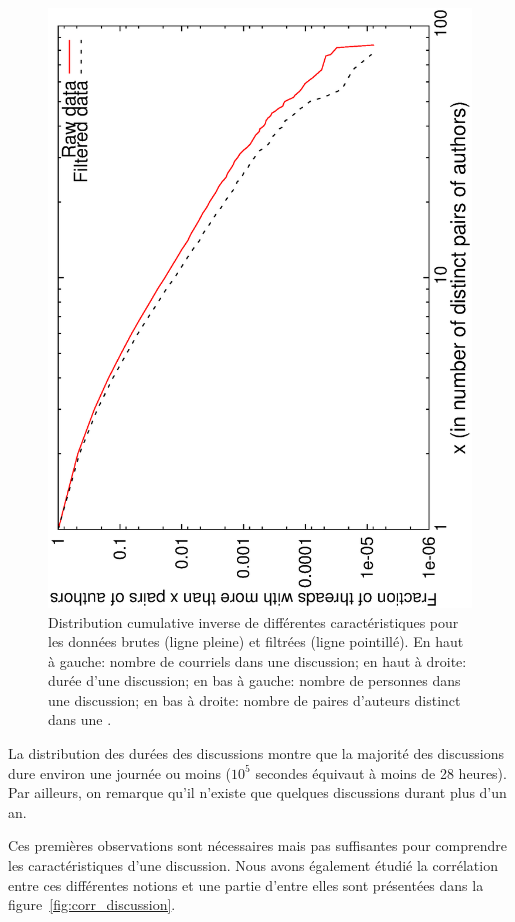 \begin{figure}
	\includegraphics[angle=-90, width=0.49\linewidth]{img/mailing/authorpairs-ccdf.eps}
	
	\caption{Distribution cumulative inverse de différentes caractéristiques pour les données brutes (ligne pleine) et filtrées (ligne pointillé). En haut à gauche: nombre de courriels dans une discussion; en haut à droite: durée d'une discussion; en bas à gauche: nombre de personnes dans une discussion; en bas à droite: nombre de paires d'auteurs distinct dans une .}
	\label{fig:dists_discussion}
\end{figure}

La distribution des durées des discussions montre que la majorité des discussions dure environ une journée ou moins ($10^5$ secondes équivaut à moins de 28 heures).
Par ailleurs, on remarque qu'il n'existe que quelques discussions durant plus d'un an.

Ces premières observations sont nécessaires mais pas suffisantes pour comprendre les caractéristiques d'une discussion.
Nous avons également étudié la corrélation entre ces différentes notions et une partie d'entre elles sont présentées dans la figure~\ref{fig:corr_discussion}.


